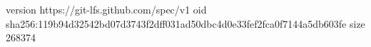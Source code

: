 version https://git-lfs.github.com/spec/v1
oid sha256:119b94d32542bd07d3743f2dff031ad50dbc4d0e33fef2fca0f7144a5db603fe
size 268374
